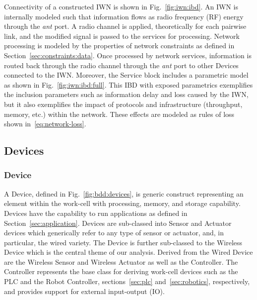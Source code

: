 \documentclass[journal, twoside]{IEEEtran}
\begin{document}
	Connectivity of a constructed IWN is shown in Fig.~\ref{fig:iwn:ibd}.  An IWN is internally modeled such that information flows as radio frequency (RF) energy through the \textit{ant} port.  A radio channel is applied, theoretically for each pairwise link, and the modified signal is passed to the services for processing.  Network processing is modeled by the properties of network constraints as defined in Section~\ref{sec:constraints:data}.  Once processed by network services, information is routed back through the radio channel through the \textit{ant} port to other Devices connected to the IWN.  Moreover, the Service block includes a parametric model as shown in Fig.~\ref{fig:iwn:ibd:full}. This IBD with exposed parametrics exemplifies the inclusion parameters such as information delay and loss caused by the IWN, but it also exemplifies the impact of protocols and infrastructure (throughput, memory, etc.) within the network.  These effects are modeled as rules of loss shown in~\eqref{eq:network-loss}.
	
	\subsection{Devices}\label{sec:devices}
    
    \subsubsection{Device}\label{sec:devices:device}
	
	A Device, defined in Fig.~\ref{fig:bdd:devices}, is generic construct representing an element within the work-cell with processing, memory, and storage capability. Devices have the capability to run applications as defined in Section~\ref{sec:application}.  Devices are sub-classed into Sensor and Actuator devices which generically refer to any type of sensor or actuator, and, in particular, the wired variety.  The Device is further sub-classed to the Wireless Device which is the central theme of our analysis.  Derived from the Wired Device are the Wireless Sensor and Wireless Actuator as well as the Controller.  The Controller represents the base class for deriving work-cell devices such as the PLC and the Robot Controller, sections~\ref{sec:plc} and~\ref{sec:robotics}, respectively, and provides support for external input-output (IO).
	
\end{document}
